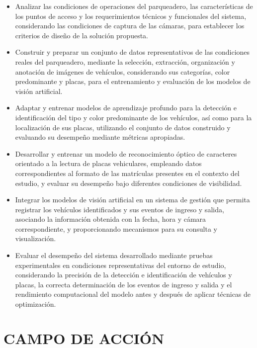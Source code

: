 \begin{itemize}
    \item
        Analizar las condiciones de operaciones del parqueadero, las características
        de los puntos de acceso y los requerimientos técnicos y funcionales del
        sistema, considerando las condiciones de captura de las cámaras,
        para establecer los criterios de diseño de la solución propuesta.
    \item
        Construir y preparar un conjunto de datos representativos de las condiciones
        reales del parqueadero, mediante la selección, extracción, organización y
        anotación de imágenes de vehículos, considerando sus categorías, color
        predominante y placas, para el entrenamiento y evaluación de los modelos
        de visión artificial.
    \item
        Adaptar y entrenar modelos de aprendizaje profundo para la detección
        e identificación del tipo y color predominante de los vehículos, así como
        para la localización de sus placas, utilizando el conjunto de datos
        construido y evaluando su desempeño mediante métricas apropiadas.
    \item
        Desarrollar y entrenar un modelo de reconocimiento óptico de caracteres orientado
        a la lectura de placas vehiculares, empleando datos correspondientes
        al formato de las matrículas presentes en el contexto del estudio, y
        evaluar su desempeño bajo diferentes condiciones de visibilidad.
    \item
        Integrar los modelos de visión artificial en un sistema de gestión
        que permita registrar los vehículos identificados y sus eventos de ingreso
        y salida, asociando la información obtenida con la fecha, hora y cámara
        correspondiente, y proporcionando mecanismos para su consulta y visualización.
    \item
        Evaluar el desempeño del sistema desarrollado mediante pruebas experimentales
        en condiciones representativas del entorno de estudio, considerando la
        precisión de la detección e identificación de vehículos y placas, la correcta
        determinación de los eventos de ingreso y salida y el rendimiento computacional
        del modelo antes y después de aplicar técnicas de optimización.
\end{itemize}

\section*{CAMPO DE ACCIÓN}

